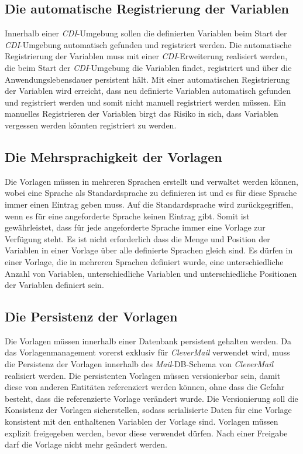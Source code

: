 \subsection{Die automatische Registrierung der Variablen}
Innerhalb einer \emph{CDI}-Umgebung sollen die definierten Variablen beim Start der \emph{CDI}-Umgebung automatisch gefunden und registriert werden. Die automatische Registrierung der Variablen muss mit einer \emph{CDI}-Erweiterung realisiert werden, die beim Start der \emph{CDI}-Umgebung die Variablen findet, registriert und über die Anwendungslebensdauer persistent hält. Mit einer automatischen Registrierung der Variablen wird erreicht, dass neu definierte Variablen automatisch gefunden und registriert werden und somit nicht manuell registriert werden müssen. Ein manuelles Registrieren der Variablen birgt das Risiko in sich, dass Variablen vergessen werden könnten registriert zu werden.

\subsection{Die Mehrsprachigkeit der Vorlagen}
Die Vorlagen müssen in mehreren Sprachen erstellt und verwaltet werden können, wobei eine Sprache als Standardsprache zu definieren ist und es für diese Sprache immer einen Eintrag geben muss. Auf die Standardsprache wird zurückgegriffen, wenn es für eine angeforderte Sprache keinen Eintrag gibt. Somit ist gewährleistet, dass für jede angeforderte Sprache immer eine Vorlage zur Verfügung steht. Es ist nicht erforderlich dass die Menge und Position der Variablen in einer Vorlage über alle definierte Sprachen gleich sind. Es dürfen in einer Vorlage, die in mehreren Sprachen definiert wurde, eine unterschiedliche Anzahl von Variablen, unterschiedliche Variablen  und unterschiedliche Positionen der Variablen definiert sein.

\subsection{Die Persistenz der Vorlagen}
\label{sec:sub-template-variable-persistenz}
Die Vorlagen müssen innerhalb einer Datenbank persistent gehalten werden. Da das Vorlagenmanagement vorerst exklusiv für \emph{CleverMail} verwendet wird, muss die Persistenz der Vorlagen innerhalb des \emph{Mail}-DB-Schema von \emph{CleverMail} realisiert werden. Die persistenten Vorlagen müssen versionierbar sein, damit diese von anderen Entitäten referenziert werden können, ohne dass die Gefahr besteht, dass die referenzierte Vorlage verändert wurde. Die Versionierung soll die Konsistenz der Vorlagen sicherstellen, sodass serialisierte Daten für eine Vorlage konsistent mit den enthaltenen Variablen der Vorlage sind. Vorlagen müssen explizit freigegeben werden, bevor diese verwendet dürfen. Nach einer Freigabe darf die Vorlage nicht mehr geändert werden.

